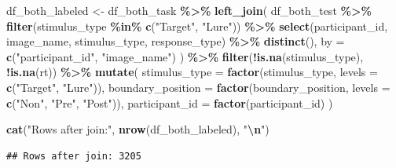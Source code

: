 \documentclass[
]{article}
\newenvironment{Shaded}{\begin{snugshade}}{\end{snugshade}}
\newcommand{\AttributeTok}[1]{\textcolor[rgb]{0.13,0.29,0.53}{#1}}
\newcommand{\FunctionTok}[1]{\textcolor[rgb]{0.13,0.29,0.53}{\textbf{#1}}}
\newcommand{\NormalTok}[1]{#1}
\newcommand{\OtherTok}[1]{\textcolor[rgb]{0.56,0.35,0.01}{#1}}
\newcommand{\SpecialCharTok}[1]{\textcolor[rgb]{0.81,0.36,0.00}{\textbf{#1}}}
\newcommand{\StringTok}[1]{\textcolor[rgb]{0.31,0.60,0.02}{#1}}
\begin{document}
\begin{Shaded}
\begin{Highlighting}[]
\NormalTok{df\_both\_labeled }\OtherTok{\textless{}{-}}\NormalTok{ df\_both\_task }\SpecialCharTok{\%\textgreater{}\%}
  \FunctionTok{left\_join}\NormalTok{(}
\NormalTok{    df\_both\_test }\SpecialCharTok{\%\textgreater{}\%}
      \FunctionTok{filter}\NormalTok{(stimulus\_type }\SpecialCharTok{\%in\%} \FunctionTok{c}\NormalTok{(}\StringTok{"Target"}\NormalTok{, }\StringTok{"Lure"}\NormalTok{)) }\SpecialCharTok{\%\textgreater{}\%}
      \FunctionTok{select}\NormalTok{(participant\_id, image\_name, stimulus\_type, response\_type) }\SpecialCharTok{\%\textgreater{}\%}
      \FunctionTok{distinct}\NormalTok{(),}
    \AttributeTok{by =} \FunctionTok{c}\NormalTok{(}\StringTok{"participant\_id"}\NormalTok{, }\StringTok{"image\_name"}\NormalTok{)}
\NormalTok{  ) }\SpecialCharTok{\%\textgreater{}\%}
  \FunctionTok{filter}\NormalTok{(}\SpecialCharTok{!}\FunctionTok{is.na}\NormalTok{(stimulus\_type), }\SpecialCharTok{!}\FunctionTok{is.na}\NormalTok{(rt)) }\SpecialCharTok{\%\textgreater{}\%}
  \FunctionTok{mutate}\NormalTok{(}
    \AttributeTok{stimulus\_type     =} \FunctionTok{factor}\NormalTok{(stimulus\_type, }\AttributeTok{levels =} \FunctionTok{c}\NormalTok{(}\StringTok{"Target"}\NormalTok{, }\StringTok{"Lure"}\NormalTok{)),}
    \AttributeTok{boundary\_position =} \FunctionTok{factor}\NormalTok{(boundary\_position, }\AttributeTok{levels =} \FunctionTok{c}\NormalTok{(}\StringTok{"Non"}\NormalTok{, }\StringTok{"Pre"}\NormalTok{, }\StringTok{"Post"}\NormalTok{)),}
    \AttributeTok{participant\_id    =} \FunctionTok{factor}\NormalTok{(participant\_id)}
\NormalTok{  )}

\FunctionTok{cat}\NormalTok{(}\StringTok{"Rows after join:"}\NormalTok{, }\FunctionTok{nrow}\NormalTok{(df\_both\_labeled), }\StringTok{"}\SpecialCharTok{\textbackslash{}n}\StringTok{"}\NormalTok{)}
\end{Highlighting}
\end{Shaded}

\begin{verbatim}
## Rows after join: 3205
\end{verbatim}

\begin{Shaded}
\end{Shaded}
\end{document}
